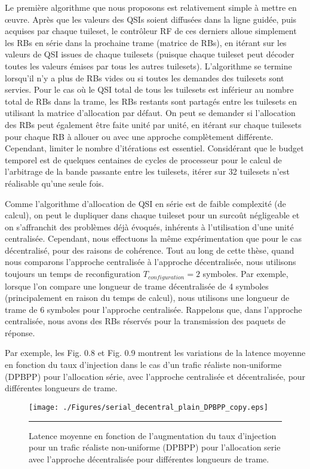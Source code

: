 Le première algorithme que nous proposons est relativement simple à mettre en œuvre. Après que les valeurs des QSIs soient diffusées dans la ligne guidée, puis acquises par chaque tuileset, le contrôleur RF de ces derniers alloue simplement les RBs en série dans la prochaine trame (matrice de RBs), en itérant sur les valeurs de QSI issues de chaque tuilesets (puisque chaque tuileset peut décoder toutes les valeurs émises par tous les autres tuilesets). L'algorithme se termine lorsqu'il n'y a plus de RBs vides ou si toutes les demandes des tuilesets sont servies. Pour le cas où le QSI total de tous les tuilesets est inférieur au nombre total de RBs dans la trame, les RBs restants sont partagés entre les tuilesets en utilisant la matrice d'allocation par défaut. On peut se demander si l'allocation des RBs peut également être faite unité par unité, en itérant sur chaque tuilesets pour chaque RB à allouer ou avec une approche complètement différente. Cependant, limiter le nombre d'itérations est essentiel. Considérant que le budget temporel est de quelques centaines de cycles de processeur pour le calcul de l'arbitrage de la bande passante entre les tuilesets, itérer sur 32 tuilesets n’est réalisable qu’une seule fois. 

Comme l’algorithme d'allocation de QSI en série est de faible complexité (de calcul), on peut le dupliquer dans chaque tuileset pour un surcoût négligeable et on s’affranchit des problèmes déjà évoqués, inhérents à l’utilisation d’une unité centralisée. Cependant, nous effectuons la même expérimentation que pour le cas décentralisé, pour des raisons de cohérence. Tout au long de cette thèse, quand nous comparons l’approche centralisée à l'approche décentralisée, nous utilisons toujours un temps de reconfiguration $T_{configuration} = 2$ symboles. Par exemple, lorsque l'on compare une longueur de trame décentralisée de 4 symboles (principalement en raison du temps de calcul), nous utilisons une longueur de trame de 6 symboles pour l'approche centralisée. Rappelons que, dans l'approche centralisée, nous avons des RBs réservés pour la transmission des paquets de réponse.

Par exemple, les Fig. 0.8 et Fig. 0.9 montrent les variations de la latence moyenne en fonction du taux d'injection dans le cas d’un trafic réaliste non-uniforme (DPBPP) pour l'allocation série, avec l'approche centralisée et décentralisée, pour différentes longueurs de trame. 

\begin{figure}[htbp]
  \centering
    \texttt{[image: ./Figures/serial\_decentral\_plain\_DPBPP\_copy.eps]}
    \rule{35em}{0.5pt}
  \caption[Latence moyenne en fonction de l'augmentation du taux d'injection pour un trafic réaliste non-uniforme (DPBPP) pour l'allocation serie avec l'approche décentralisée pour différentes longueurs de trame.]{Latence moyenne en fonction de l'augmentation du taux d'injection pour un trafic réaliste non-uniforme (DPBPP) pour l'allocation serie avec l'approche décentralisée pour différentes longueurs de trame.}
  \label{fig:Electron}
\end{figure}

